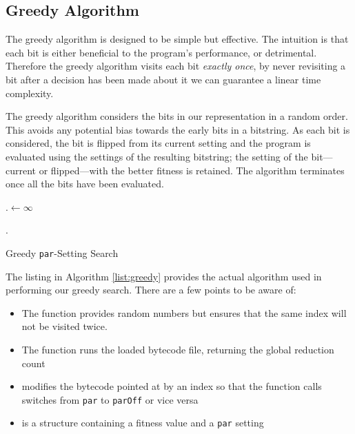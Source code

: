 \subsection{Greedy Algorithm}

The greedy algorithm is designed to be simple but effective. The intuition is
that each bit is either beneficial to the program's performance, or
detrimental. Therefore the greedy algorithm visits each bit \emph{exactly
once}, by never revisiting a bit after a decision has been made about it we can
guarantee a linear time complexity.

The greedy algorithm considers the bits in our representation in a random
order.  This avoids any potential bias towards the early bits in a bitstring.
As each bit is considered, the bit is flipped from its current setting and the
program is evaluated using the settings of the resulting bitstring; the setting
of the bit---current or flipped---with the better fitness is retained.  The
algorithm terminates once all the bits have been evaluated.


\begin{algorithm}
\DontPrintSemicolon
{}

\BlankLine

\Best.\Fitness $\leftarrow \infty$
\BlankLine

\BlankLine
\Return \Best.\Setting\;
\caption{Greedy \texttt{par}-Setting Search}
\label{list:greedy}
\end{algorithm}

The listing in Algorithm \ref{list:greedy} provides the actual algorithm used
in performing our greedy search. There are a few points to be aware of:

\begin{itemize}
  \item The function  provides random numbers but ensures
        that the same index will not be visited twice.
  \item The function  runs the loaded bytecode file,
        returning the global reduction count
  \item {} modifies the bytecode pointed at by an index so that
        the function calls switches from \verb|par| to \verb|parOff| or vice versa
  \item {} is a structure containing a fitness value and a \verb|par|
        setting
\end{itemize}

